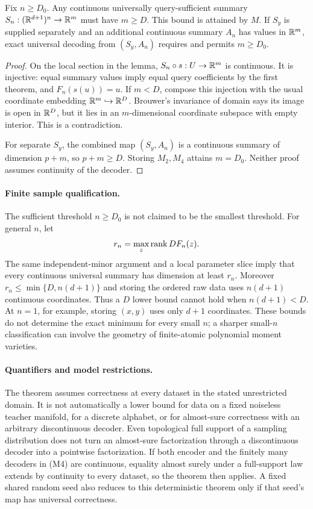 \begin{theorem}
\label{thm:memory-dimension}
Fix $n\ge D_0$. Any continuous universally query-sufficient summary
$S_n:(\mathbb R^{d+1})^n\to\mathbb R^m$ must have $m\ge D$. This bound is attained
by $M$. If $S_y$ is supplied separately and an additional continuous
summary $A_n$ has values in $\mathbb R^m$, exact universal decoding from
$(S_y,A_n)$ requires and permits $m\ge D_0$.
\end{theorem}
\begin{proof}
On the local section in the lemma, $S_n\circ s:U\to\mathbb R^m$ is
continuous. It is injective: equal summary values imply equal query
coefficients by the first theorem, and $F_n(s(u))=u$.
If $m<D$, compose this injection with the usual coordinate embedding
$\mathbb R^m\hookrightarrow\mathbb R^D$. Brouwer's invariance of domain says its
image is open in $\mathbb R^D$, but it lies in an $m$-dimensional coordinate
subspace with empty interior. This is a contradiction.

For separate $S_y$, the combined map $(S_y,A_n)$ is a continuous
summary of dimension $p+m$, so $p+m\ge D$. Storing $M_2,M_4$
attains $m=D_0$. Neither proof assumes continuity of the decoder.
\end{proof}

\paragraph{Finite sample qualification.}
The sufficient threshold $n\ge D_0$ is not claimed to be the smallest
threshold. For general $n$, let
\[
 r_n=\max_z\operatorname{rank} DF_n(z).
\]
The same independent-minor argument and a local parameter slice imply
that every continuous universal summary has dimension at least $r_n$.
Moreover $r_n\le\min\{D,n(d+1)\}$ and storing the ordered raw data
uses $n(d+1)$ continuous coordinates. Thus a $D$ lower bound cannot
hold when $n(d+1)<D$. At $n=1$, for example, storing $(x,y)$ uses
only $d+1$ coordinates. These bounds do not determine the exact
minimum for every small $n$; a sharper small-$n$ classification can
involve the geometry of finite-atomic polynomial moment varieties.

\paragraph{Quantifiers and model restrictions.}
The theorem assumes correctness at every dataset in the stated
unrestricted domain. It is not automatically a lower bound for data
on a fixed noiseless teacher manifold, for a discrete alphabet, or
for almost-sure correctness with an arbitrary discontinuous decoder.
Even topological full support of a sampling distribution does not turn
an almost-sure factorization through a discontinuous decoder into a
pointwise factorization. If both encoder and the finitely many
decoders in (M4) are continuous, equality almost surely under a
full-support law extends by continuity to every dataset, so the
theorem then applies. A fixed shared random seed also reduces to this
deterministic theorem only if that seed's map has universal correctness.

